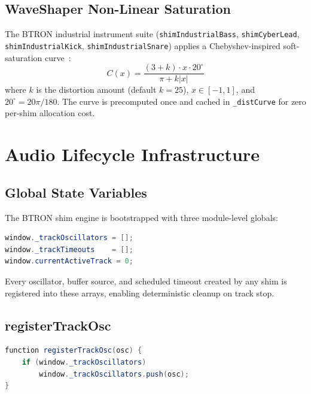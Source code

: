 \documentclass[10pt,journal,compsoc,twocolumn]{article}
\begin{document}
\subsection{WaveShaper Non-Linear Saturation}

The BTRON industrial instrument suite (\texttt{shimIndustrialBass},
\texttt{shimCyberLead}, \texttt{shimIndustrialKick}, \texttt{shimIndustrialSnare})
applies a Chebyshev-inspired soft-saturation curve~\cite{pakarinen2009review}:
\begin{equation}
C(x) = \frac{(3 + k)\cdot x \cdot 20^\circ}{\pi + k|x|}
\label{eq:waveshaper}
\end{equation}
where $k$ is the distortion amount (default $k=25$), $x \in [-1,1]$, and
$20^\circ = 20\pi/180$.  The curve is precomputed once and cached in
\texttt{\_distCurve} for zero per-shim allocation cost.

\section{Audio Lifecycle Infrastructure}
\label{sec:lifecycle}

\subsection{Global State Variables}

The BTRON shim engine is bootstrapped with three module-level globals:

\begin{lstlisting}[language=Java,
    caption={Audio lifecycle state (index.html, line 3184).}]
window._trackOscillators = [];
window._trackTimeouts    = [];
window.currentActiveTrack = 0;
\end{lstlisting}

Every oscillator, buffer source, and scheduled timeout created by any shim is
registered into these arrays, enabling deterministic cleanup on track stop.

\subsection{registerTrackOsc}

\begin{lstlisting}[language=Java,
    caption={\texttt{registerTrackOsc} — push into GC tracking array (line 3188).}]
function registerTrackOsc(osc) {
    if (window._trackOscillators)
        window._trackOscillators.push(osc);
}
\end{lstlisting}
\end{document}
